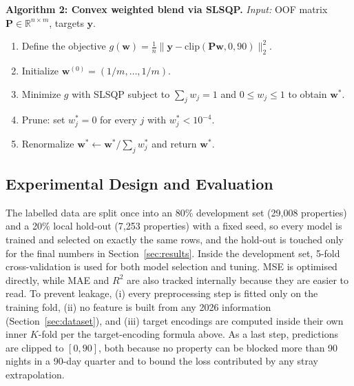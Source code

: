 \documentclass[journal]{IEEEtran}
\begin{document}
\vspace{2pt}
\noindent\textbf{Algorithm 2: Convex weighted blend via SLSQP.}
\emph{Input:} OOF matrix $\mathbf{P}\in\mathbb{R}^{n\times m}$, targets
$\mathbf{y}$.
\begin{enumerate}
\item Define the objective
$g(\mathbf{w})=\frac{1}{n}\lVert\mathbf{y}-\mathrm{clip}(\mathbf{P}\mathbf{w},0,90)\rVert_2^2$.
\item Initialize $\mathbf{w}^{(0)}=(1/m,\dots,1/m)$.
\item Minimize $g$ with SLSQP subject to $\sum_j w_j=1$ and $0\le w_j\le1$ to
obtain $\mathbf{w}^{*}$.
\item Prune: set $w_j^{*}=0$ for every $j$ with $w_j^{*}<10^{-4}$.
\item Renormalize $\mathbf{w}^{*}\leftarrow\mathbf{w}^{*}/\sum_j w_j^{*}$ and
return $\mathbf{w}^{*}$.
\end{enumerate}
\vspace{2pt}

\subsection{Experimental Design and Evaluation}
The labelled data are split once into an 80\% development set (29{,}008
properties) and a 20\% local hold-out (7{,}253 properties) with a fixed seed,
so every model is trained and selected on exactly the same rows, and the
hold-out is touched only for the final numbers in Section~\ref{sec:results}.
Inside the development set, 5-fold cross-validation is used for both model
selection and tuning. MSE is optimised directly, while MAE and $R^2$ are also
tracked internally because they are easier to read. To prevent leakage, (i)
every preprocessing step is fitted only on the training fold, (ii) no feature
is built from any 2026 information (Section~\ref{sec:dataset}), and (iii)
target encodings are computed inside their own inner $K$-fold per
the target-encoding formula above. As a last step, predictions are clipped to $[0,90]$, both
because no property can be blocked more than 90 nights in a 90-day quarter and
to bound the loss contributed by any stray extrapolation.
\end{document}
